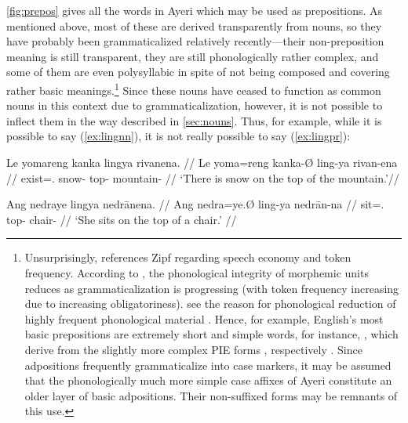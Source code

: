 
\autoref{fig:prepos} gives all the words in Ayeri which may be used as
prepositions. As mentioned above, most of these are derived transparently from
nouns, so they have probably been grammaticalized relatively recently---their
non-preposition meaning is still transparent, they are still phonologically
rather complex, and some of them are even polysyllabic in spite of not being
composed and covering rather basic meanings.\footnote{Unsurprisingly,
\citet[129]{hagege2010} references Zipf regarding speech economy and token
frequency. According to \citet[134--141]{lehmann2015}, the phonological
integrity of morphemic units reduces as grammaticalization is progressing (with
token frequency increasing due to increasing obligatoriness).
\citet{bybeehopper2001b} see the reason for phonological reduction of highly
frequent phonological material . Hence, for example, English's most basic prepositions
are extremely short and simple words, for instance, , which
derive from the slightly more complex PIE forms ,
respectively \citep[1, 39, 269]{kroonen2013}. Since adpositions frequently
grammaticalize into case markers, it may be assumed that the phonologically
much more simple case affixes of Ayeri constitute an older layer of basic
adpositions. Their non-suffixed forms may be remnants of this use.} Since these
nouns have ceased to function as common nouns in this context due to
grammaticalization, however, it is not possible to inflect them in the way
described in \autoref{sec:nouns}. Thus, for example, while it is possible to
say (\ref{ex:lingnn}), it is not really possible to say (\ref{ex:lingpr}):

\pex
\a\label{ex:lingnn}\begingl
	\gla Le yomareng kanka lingya rivanena. //
	\glb Le yoma=reng kanka-Ø ling-ya rivan-ena //
	\glc \PatTI{} exist=\TsgI{}.\Aarg{} snow-\Top{} top-\Loc{}
		mountain-\Gen{} //
	\glft `There is snow on the top of the mountain.'\footnotemark //
\endgl

\a\label{ex:lingpr}\ljudge* \begingl
	\gla Ang nedraye lingya nedrānena. //
	\glb Ang nedra=ye.Ø ling-ya nedrān-na //
	\glc \AgtT{} sit=\TsgF{}.\Top{} top-\Loc{} chair-\Gen{} //
	\glft `\ques{}She sits on the top of a chair.' //
\endgl

